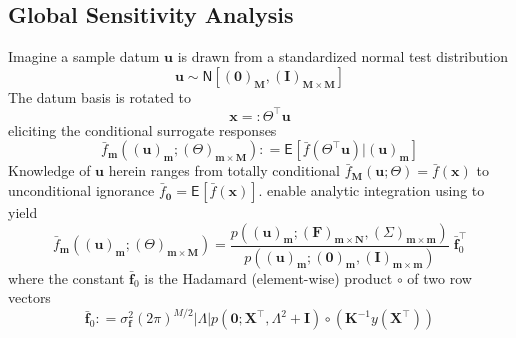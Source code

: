 \documentclass[preprint,12pt]{elsarticle}
\newcommand*{\M}[1]{\ensuremath{#1}\xspace}
\newcommand*{\vr}[1]{\M{\mathbf{#1}}}
\newcommand*{\deq}{\M{\mathrel{\mathop:}=}}
\newcommand*{\deqr}{\M{=\mathrel{\mathop:}}}
\newcommand*{\ev}[2][]{\mathsf{E}_{#1}\!\left\lbrack{} #2 \right\rbrack}
\newcommand*{\gauss}[2]{\mathsf{N}\!\left\lbrack{} #1 , #2 \right\rbrack}
\newcommand*{\modulus}[1]{\M{\left\lvert#1\right\rvert}}
\begin{document}
        \subsection{Global Sensitivity Analysis} \label{sub:Method:GSA}
            Imagine a sample datum \(\vr{u}\) is drawn from a standardized normal test distribution
            \begin{equation} \label{eq:Method:GSA:uDist}
                \vr{u} \sim \gauss{(\vr{0})_{\vr{M}}}{(\vr{I})_{\vr{M}\times\vr{M}}}
            \end{equation}
            The datum basis is rotated to
            \begin{equation} \label{eq:Method:GSA:Rotation}
                \vr{x} \deqr \Theta^{\intercal} \vr{u}
            \end{equation}
            eliciting the conditional surrogate responses
            \begin{equation} \label{eq:Method:GSA:fmDef}
                \bar{f}_{\vr{m}}((\vr{u})_{\vr{m}} ; (\Theta)_{\vr{m}\times \vr{M}})
                    \deq \ev{\bar{f}(\Theta^{\intercal} \vr{u}) \vert (\vr{u})_{\vr{m}}}
            \end{equation}    
            Knowledge of $\vr{u}$ herein ranges from totally conditional $\bar{f}_{\vr{M}}(\vr{u};\Theta)=\bar{f}(\vr{x})$ to unconditional ignorance $\bar{f}_{\vr{0}}=\ev{\bar{f}(\vr{x})}$.
             enable analytic integration using  to yield
            \begin{equation} \label{eq:Method:GSA:fmCalc}
                \bar{f}_{\vr{m}}((\vr{u})_{\vr{m}} ; (\Theta)_{\vr{m}\times \vr{M}}) =  
				\frac {p\!\left((\vr{u})_{\vr{m}} ; (\vr{F})_{\vr{m}\times\vr{N}}, (\Sigma)_{\vr{m}\times\vr{m}}\right)}
                    {p\!\left((\vr{u})_{\vr{m}} ; (\vr{0})_{\vr{m}},(\vr{I})_{\vr{m}\times\vr{m}}\right)}
                \;\bar{\vr{f}}_{0}^{\intercal}    
            \end{equation}
            where the constant $\bar{\vr{f}}_{0}$ is the Hadamard (element-wise) product $\circ$ of two row vectors
            \begin{equation} \label{eq:Method:GSA:fb0Def}
                \bar{\vr{f}}_{0} \deq
                \sigma^{2}_\vr{f} (2 \pi)^{M/2} \modulus{\Lambda} p\!\left(\vr{0};\vr{X}^{\intercal} , \Lambda^{2} + \vr{I}\right)
                \circ\left(\vr{K}^{-1} y(\vr{X}^{\intercal})\right) 
            \end{equation}
\end{document}
